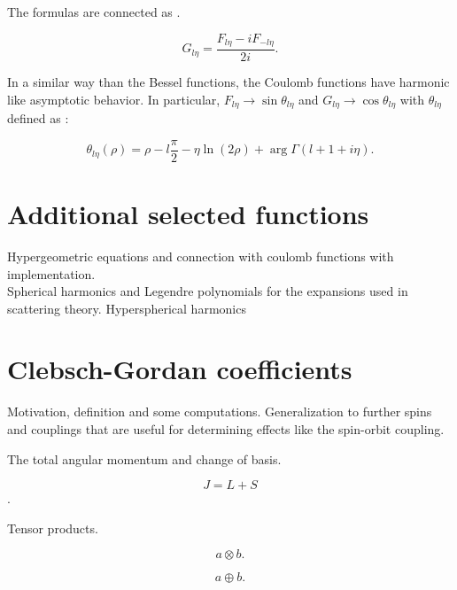 \documentclass[openany]{book}
\begin{document}
The formulas are connected as \cite{gaspard_2018}.

\begin{equation}  \label{eq:special_coulomb_connection}
	G_{l\eta} = \frac{F_{l\eta} - iF_{-l\eta} }{2i}.
\end{equation}

In a similar way than the Bessel functions, the Coulomb functions have harmonic like asymptotic behavior. In particular,  $F_{l\eta} \rightarrow \sin{\theta_{l\eta}}$ and $G_{l\eta} \rightarrow \cos{\theta_{l\eta}}$ with $\theta_{l\eta}$ defined as :

\begin{equation} \label{eq:special_coulomb_theta}
	\theta_{l\eta}(\rho) = \rho -  l\frac{\pi}{2}  - \eta\ln{(2\rho)} +  \arg\Gamma(l+ 1+i\eta).
\end{equation}

\section{Additional selected functions} \label{sec:additionalFunctions}

Hypergeometric equations and connection with coulomb functions with implementation. \\

Spherical harmonics and Legendre polynomials for the expansions used in scattering theory.  Hyperspherical harmonics\\

\section{Clebsch-Gordan coefficients} \label{sec:clebschGordan}

Motivation, definition and some computations. Generalization to further spins and couplings that are useful for determining effects like the spin-orbit coupling. 

The total angular momentum and change of basis.

\begin{equation} \label{eq:angularMomentum_definition}
	J = L + S
\end{equation}.

Tensor products.

\begin{equation} \label{eq:angularMomentum_tensorSum}
	a \otimes b.
\end{equation}

\begin{equation} \label{eq:angularMomentum_tensorProduct}
	a \oplus b.
\end{equation}
\end{document}
